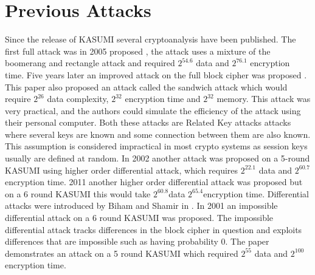 \section{Previous Attacks}
Since the release of KASUMI several cryptoanalysis have been published.
The first full attack was in 2005 proposed \cite{rect}, the attack
uses a mixture of the boomerang and rectangle
attack\cite{rectangle}\cite{boom} and required $2^{54.6}$ data and $2^{76.1}$ encryption time.
Five years later an improved attack on the full block cipher was proposed \cite{sand}. This paper also proposed an attack called the sandwich attack which would require $2^{26}$ data complexity, $2^{32}$ encryption time and $2^{32}$ memory. This attack was very practical, and the authors could simulate the efficiency of the attack using their personal computer. Both these attacks are Related Key attacks\cite{relate} attacks where several keys are known and some connection between them are also known. This assumption is considered impractical in most crypto systems as session keys usually are defined at random. In 2002 another attack was proposed on a 5-round KASUMI\cite{single2002} using higher order differential attack, which requires  $2^{22.1}$ data and $2^{60.7}$ encryption time. 2011 another higher order differential attack was proposed but on a 6 round KASUMI\cite{single} this would take $2^{60.8}$data $2^{65.4}$encryption time. Differential attacks were introduced by Biham and Shamir in \cite{diff}. In 2001 an impossible differential attack on a 6 round KASUMI was proposed\cite{imp}. The impossible differential attack tracks differences in the block cipher in question and exploits differences that are impossible such as having probability 0. The paper demonstrates an attack on a 5 round KASUMI which required $2^{55}$ data and $2^{100}$ encryption time.


